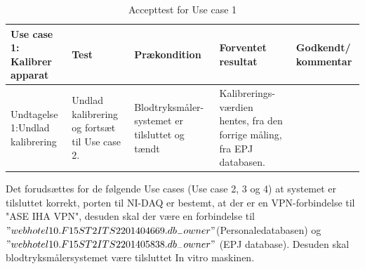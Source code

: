 \begin{table}[H]
\caption{Accepttest for Use case 1}\label{tab:tabel8}
\begin{tabular}{|>{\raggedright\arraybackslash}p{2.5cm}| >{\raggedright\arraybackslash}p{2.9cm} | >{\raggedright\arraybackslash}p{2.9cm} | >{\raggedright\arraybackslash}p{2.9cm} | >{\raggedright\arraybackslash}p{2.8cm} |}
   \hline
   \textbf{Use case 1: Kalibrer apparat} &\textbf{Test}& \textbf{Prækondition} & \textbf{Forventet resultat} & \textbf{Godkendt/ kommentar}\\ \hline
 Undtagelse 1:Undlad kalibrering & Undlad kalibrering og fortsæt til Use case 2. & Blodtryksmåler-systemet er tilsluttet og tændt & Kalibrerings-værdien hentes, fra den forrige måling, fra EPJ databasen. & \\\hline
\end{tabular}
\end{table}
Det forudsættes for de følgende Use cases (Use case 2, 3 og 4) at systemet er tilsluttet korrekt, porten til NI-DAQ er bestemt, at der er en VPN-forbindelse til "ASE IHA VPN", desuden skal der være en forbindelse til $"webhotel10.F15ST2ITS2201404669.db_{-}owner"$(Personaledatabasen) og $"webhotel10.F15ST2ITS2201405838.db_{-}owner"$ (EPJ database). Desuden skal blodtryksmålersystemet være tilsluttet In vitro maskinen.
